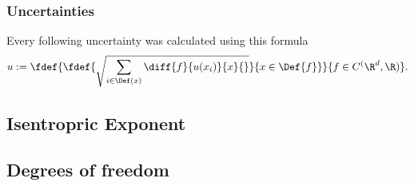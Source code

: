 \documentclass[../main.tex]{subfiles}
\begin{document}
    \subsubsection*{Uncertainties}
        Every following uncertainty was calculated using this formula
        \[u:=\fdef{\fdef{\sqrt{\sum_{i\in\Def(x)}\diff{f}{u(x_i)}{x}{}}}{x\in\Def{f}}}{f\in C^(\R^d,\R)}.\]
		        
        
    \subsection{Isentropric Exponent}

    \subsection{Degrees of freedom}
        
\end{document}
